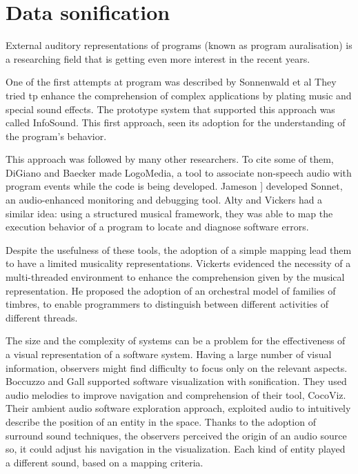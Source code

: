 \section{Data sonification}

External auditory representations of programs (known as program auralisation) is a researching field that 
is getting even more interest in the recent years.

One of the first attempts at program was described by Sonnenwald et al \cite{Sonnenwald1990}
They tried tp enhance the comprehension of complex applications by plating music and special sound effects. 
The prototype system that supported this approach was called InfoSound.
This first approach, seen its adoption for the understanding of the program's behavior. 

This approach was followed by many other researchers. To cite some of them, DiGiano and Baecker \cite{DiGiano1993} made LogoMedia, a tool to associate non-speech audio with program events while the code is being developed. 
Jameson \cite{Jameson1994}] developed Sonnet, an audio-enhanced monitoring and debugging tool.  
Alty and Vickers \cite{Vickers2003} had a similar idea: using a structured musical framework, they was able to map the execution behavior of a program to locate and diagnose software errors. 

Despite the usefulness of these tools, the adoption of a simple mapping lead them to have a limited musicality representations.  
Vickerts \cite{Vickers2004} evidenced the necessity of a multi-threaded environment to enhance the comprehension given by the musical representation. 
He proposed the adoption of an orchestral model of families of timbres, to enable programmers to distinguish between different activities of different threads.


The size and the complexity of systems can be a problem for the effectiveness of a visual representation of a software system.
Having a large number of visual information, observers might find difficulty to focus only on the relevant aspects. 
Boccuzzo and Gall \cite{Boccuzzo2009} supported software visualization with sonification. 
They used audio melodies to improve navigation and comprehension of their tool, CocoViz.
Their ambient audio software exploration approach, exploited audio to intuitively describe the position of an entity in the space. 
Thanks to the adoption of surround sound techniques, the observers perceived the origin of an audio source so, it could adjust his navigation in the visualization.
Each kind of entity played a different sound, based on a mapping criteria.


